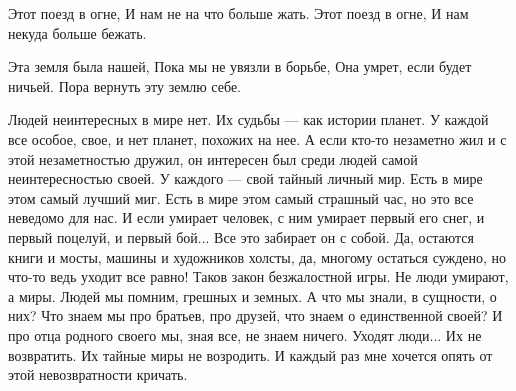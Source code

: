  
 
 
 
 

Этот поезд в огне,
И нам не на что больше жать.
Этот поезд в огне,
И нам некуда больше бежать.

Эта земля была нашей,
Пока мы не увязли в борьбе,
Она умрет, если будет ничьей.
Пора вернуть эту землю себе.


Людей неинтересных в мире нет.
Их судьбы — как истории планет.
У каждой все особое, свое,
и нет планет, похожих на нее.
А если кто-то незаметно жил
и с этой незаметностью дружил,
он интересен был среди людей
самой неинтересностью своей.
У каждого — свой тайный личный мир.
Есть в мире этом самый лучший миг.
Есть в мире этом самый страшный час,
но это все неведомо для нас.
И если умирает человек,
с ним умирает первый его снег,
и первый поцелуй, и первый бой...
Все это забирает он с собой.
Да, остаются книги и мосты,
машины и художников холсты,
да, многому остаться суждено,
но что-то ведь уходит все равно!
Таков закон безжалостной игры.
Не люди умирают, а миры.
Людей мы помним, грешных и земных.
А что мы знали, в сущности, о них?
Что знаем мы про братьев, про друзей,
что знаем о единственной своей?
И про отца родного своего
мы, зная все, не знаем ничего.
Уходят люди... Их не возвратить.
Их тайные миры не возродить.
И каждый раз мне хочется опять
от этой невозвратности кричать.
